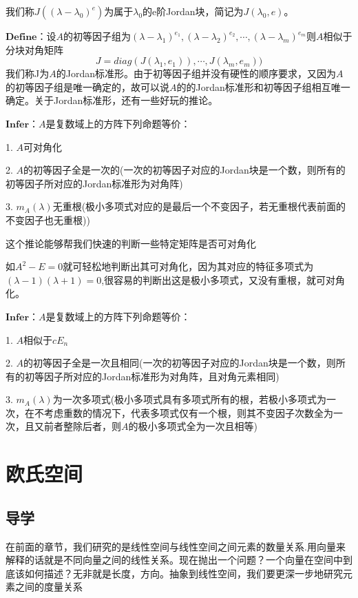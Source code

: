 \documentclass[lang=cn,10pt]{elegantbook}
\begin{document}
我们称$J((\lambda-\lambda_{0})^{e})$为属于$\lambda_{0}$的e阶Jordan块，简记为$J(\lambda_{0},e)$。

$\mathbf{Define}$：设$\mathit{A}$的初等因子组为$(\lambda-\lambda_{1})^{e_{1}},(\lambda-\lambda_{2})^{e_{2}},\cdots,(\lambda-\lambda_{m})^{e_{m}}$则$\mathit{A}$相似于分块对角矩阵
\begin{equation*}
	J=diag(J(\lambda_{1},e_{1})),\cdots,J(\lambda_{m},e_{m}))
\end{equation*}
我们称J为$\mathit{A}$的Jordan标准形。由于初等因子组并没有硬性的顺序要求，又因为$\mathit{A}$的初等因子组是唯一确定的，故可以说$\mathit{A}$的的Jordan标准形和初等因子组相互唯一确定。关于Jordan标准形，还有一些好玩的推论。

$\mathbf{Infer}$：$\mathit{A}$是复数域上的方阵下列命题等价：

1. $\mathit{A}$可对角化

2. $\mathit{A}$的初等因子全是一次的(一次的初等因子对应的Jordan块是一个数，则所有的初等因子所对应的Jordan标准形为对角阵)

3. $m_{A}(\lambda)$无重根(极小多项式对应的是最后一个不变因子，若无重根代表前面的不变因子也无重根))

这个推论能够帮我们快速的判断一些特定矩阵是否可对角化

如$A^{2}-E=0$就可轻松地判断出其可对角化，因为其对应的特征多项式为$(\lambda-1)(\lambda+1)=0$,很容易的判断出这是极小多项式，又没有重根，就可对角化。

$\mathbf{Infer}$：$\mathit{A}$是复数域上的方阵下列命题等价：

1. $\mathit{A}$相似于$cE_{n}$

2. $\mathit{A}$的初等因子全是一次且相同(一次的初等因子对应的Jordan块是一个数，则所有的初等因子所对应的Jordan标准形为对角阵，且对角元素相同)

3. $m_{A}(\lambda)$为一次多项式(极小多项式具有多项式所有的根，若极小多项式为一次，在不考虑重数的情况下，代表多项式仅有一个根，则其不变因子次数全为一次，且又前者整除后者，则$\mathit{A}$的极小多项式全为一次且相等)

\chapter{欧氏空间}
\section{导学}

	在前面的章节，我们研究的是线性空间与线性空间之间元素的数量关系.用向量来解释的话就是不同向量之间的线性关系。现在抛出一个问题？一个向量在空间中到底该如何描述？无非就是长度，方向。抽象到线性空间，我们要更深一步地研究元素之间的度量关系
\end{document}
